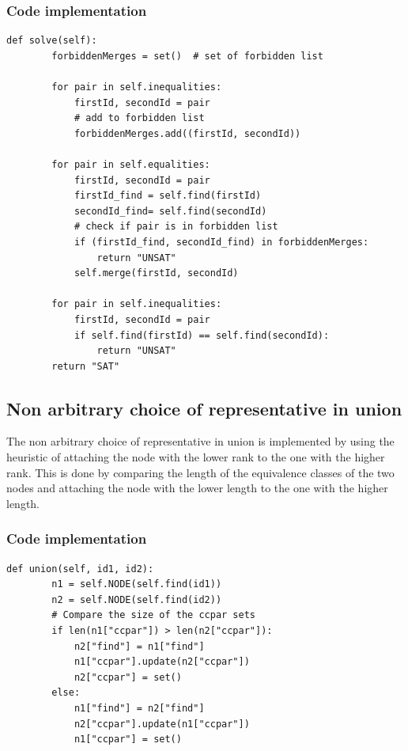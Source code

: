 \documentclass[11pt]{report}
\begin{document}
\subsubsection*{Code implementation}
\begin{lstlisting}[style=pythoncode]
    def solve(self):
        forbiddenMerges = set()  # set of forbidden list

        for pair in self.inequalities:
            firstId, secondId = pair
            # add to forbidden list
            forbiddenMerges.add((firstId, secondId)) 

        for pair in self.equalities:
            firstId, secondId = pair
            firstId_find = self.find(firstId) 
            secondId_find= self.find(secondId)
            # check if pair is in forbidden list
            if (firstId_find, secondId_find) in forbiddenMerges: 
                return "UNSAT"
            self.merge(firstId, secondId)

        for pair in self.inequalities:
            firstId, secondId = pair
            if self.find(firstId) == self.find(secondId):
                return "UNSAT"
        return "SAT"
\end{lstlisting}



\subsection*{Non arbitrary choice of representative in union} 
The non arbitrary choice of representative in union is implemented by using the heuristic of attaching the node with the lower rank to the one with the higher rank. This is done by comparing the length of the equivalence classes of the two nodes and attaching the node with the lower length to the one with the higher length.
\subsubsection*{Code implementation}
\begin{lstlisting}[style=pythoncode]
    def union(self, id1, id2):
        n1 = self.NODE(self.find(id1))
        n2 = self.NODE(self.find(id2))
        # Compare the size of the ccpar sets
        if len(n1["ccpar"]) > len(n2["ccpar"]): 
            n2["find"] = n1["find"]
            n1["ccpar"].update(n2["ccpar"])
            n2["ccpar"] = set()
        else:
            n1["find"] = n2["find"]
            n2["ccpar"].update(n1["ccpar"])
            n1["ccpar"] = set()

\end{lstlisting}
\newpage
\end{document}
